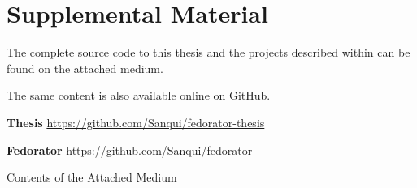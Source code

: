 \chapter{Supplemental Material}

The complete source code to this thesis and the projects described within can be found on the attached medium.  

The same content is also available online on GitHub.

\noindent \textbf{Thesis} \hfill
    \url{https://github.com/Sanqui/fedorator-thesis}

\noindent \textbf{Fedorator} \hfill
    \url{https://github.com/Sanqui/fedorator}

\vfill

\begin{dirfigure}%
\caption{Contents of the Attached Medium}
\end{dirfigure}
